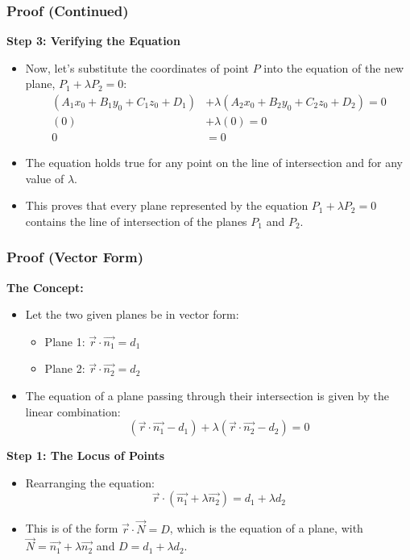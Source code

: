 \begin{frame}
    \frametitle{Proof (Continued)}
    \textbf{Step 3: Verifying the Equation}
    \begin{itemize}
        \item Now, let's substitute the coordinates of point $P$ into the equation of the new plane, $P_1 + \lambda P_2 = 0$:
        \begin{align*} (A_1x_0 + B_1y_0 + C_1z_0 + D_1) &+ \lambda(A_2x_0 + B_2y_0 + C_2z_0 + D_2) = 0 \\ (0) &+ \lambda(0) = 0 \\ 0 &= 0 \end{align*}
        \item The equation holds true for any point on the line of intersection and for any value of $\lambda$.
        \item This proves that every plane represented by the equation $P_1 + \lambda P_2 = 0$ contains the line of intersection of the planes $P_1$ and $P_2$.
    \end{itemize}
\end{frame}
\begin{frame}
    \frametitle{Proof (Vector Form)}
    \textbf{The Concept:}
    \begin{itemize}
        \item Let the two given planes be in vector form:
        \begin{itemize}
            \item Plane 1: $\vec{r} \cdot \vec{n_1} = d_1$
            \item Plane 2: $\vec{r} \cdot \vec{n_2} = d_2$
        \end{itemize}
        \item The equation of a plane passing through their intersection is given by the linear combination:
        \[(\vec{r} \cdot \vec{n_1} - d_1) + \lambda(\vec{r} \cdot \vec{n_2} - d_2) = 0\]
    \end{itemize}

    \textbf{Step 1: The Locus of Points}
    \begin{itemize}
        \item Rearranging the equation:
        \[\vec{r} \cdot (\vec{n_1} + \lambda\vec{n_2}) = d_1 + \lambda d_2\]
        \item This is of the form $\vec{r} \cdot \vec{N} = D$, which is the equation of a plane, with $\vec{N} = \vec{n_1} + \lambda\vec{n_2}$ and $D = d_1 + \lambda d_2$.
    \end{itemize}
\end{frame}

